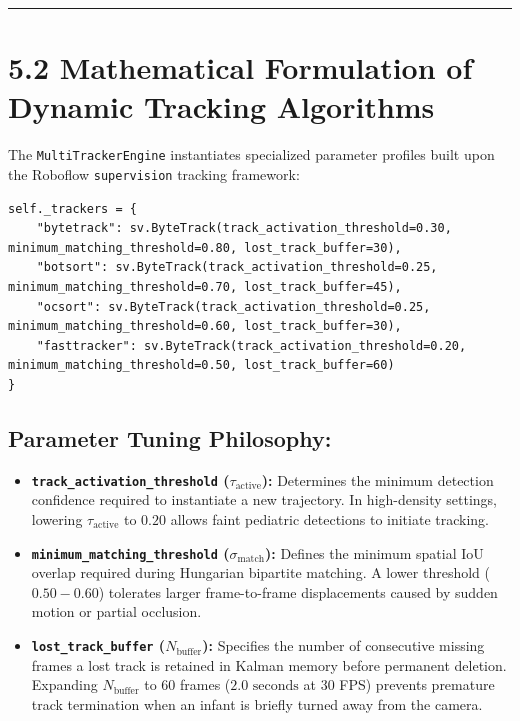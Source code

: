 \begin{center}\rule{0.5\linewidth}{0.5pt}\end{center}

\section{5.2 Mathematical Formulation of Dynamic Tracking
Algorithms}\label{mathematical-formulation-of-dynamic-tracking-algorithms}

The \texttt{MultiTrackerEngine} instantiates specialized parameter
profiles built upon the Roboflow \texttt{supervision} tracking
framework:

\begin{verbatim}
self._trackers = {
    "bytetrack": sv.ByteTrack(track_activation_threshold=0.30, minimum_matching_threshold=0.80, lost_track_buffer=30),
    "botsort": sv.ByteTrack(track_activation_threshold=0.25, minimum_matching_threshold=0.70, lost_track_buffer=45),
    "ocsort": sv.ByteTrack(track_activation_threshold=0.25, minimum_matching_threshold=0.60, lost_track_buffer=30),
    "fasttracker": sv.ByteTrack(track_activation_threshold=0.20, minimum_matching_threshold=0.50, lost_track_buffer=60)
}
\end{verbatim}

\subsection{Parameter Tuning
Philosophy:}\label{parameter-tuning-philosophy}

\begin{itemize}
\tightlist
\item
  \textbf{\texttt{track\_activation\_threshold}
  (\(\tau_{\text{active}}\)):} Determines the minimum detection
  confidence required to instantiate a new trajectory. In high-density
  settings, lowering \(\tau_{\text{active}}\) to \(0.20\) allows faint
  pediatric detections to initiate tracking.
\item
  \textbf{\texttt{minimum\_matching\_threshold}
  (\(\sigma_{\text{match}}\)):} Defines the minimum spatial IoU overlap
  required during Hungarian bipartite matching. A lower threshold
  (\(0.50 - 0.60\)) tolerates larger frame-to-frame displacements caused
  by sudden motion or partial occlusion.
\item
  \textbf{\texttt{lost\_track\_buffer} (\(N_{\text{buffer}}\)):}
  Specifies the number of consecutive missing frames a lost track is
  retained in Kalman memory before permanent deletion. Expanding
  \(N_{\text{buffer}}\) to 60 frames (\(2.0\text{ seconds}\) at 30 FPS)
  prevents premature track termination when an infant is briefly turned
  away from the camera.
\end{itemize}

